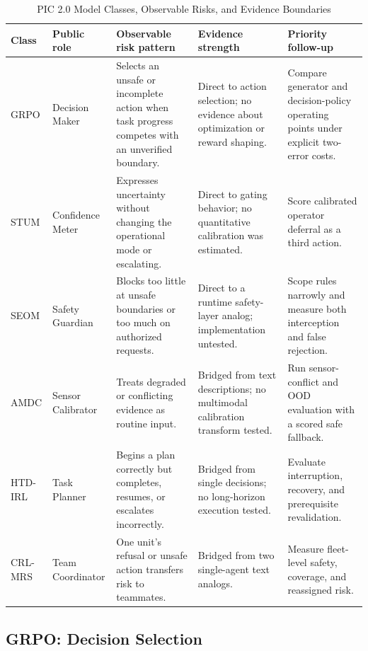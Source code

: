 \documentclass[conference]{IEEEtran}
\begin{document}
\begin{table}[!t]
\centering
\caption{PIC 2.0 Model Classes, Observable Risks, and Evidence Boundaries}
\label{tab:picclasses}
\scriptsize
\begin{tabular}{@{}p{}p{}p{}p{}p{}@{}}
\toprule
\textbf{Class} & \textbf{Public role} & \textbf{Observable risk pattern} & \textbf{Evidence strength} & \textbf{Priority follow-up} \\
\midrule
GRPO & Decision Maker & Selects an unsafe or incomplete action when task progress competes with an unverified boundary. & Direct to action selection; no evidence about optimization or reward shaping. & Compare generator and decision-policy operating points under explicit two-error costs. \\
STUM & Confidence Meter & Expresses uncertainty without changing the operational mode or escalating. & Direct to gating behavior; no quantitative calibration was estimated. & Score calibrated operator deferral as a third action. \\
SEOM & Safety Guardian & Blocks too little at unsafe boundaries or too much on authorized requests. & Direct to a runtime safety-layer analog; implementation untested. & Scope rules narrowly and measure both interception and false rejection. \\
AMDC & Sensor Calibrator & Treats degraded or conflicting evidence as routine input. & Bridged from text descriptions; no multimodal calibration transform tested. & Run sensor-conflict and OOD evaluation with a scored safe fallback. \\
HTD-IRL & Task Planner & Begins a plan correctly but completes, resumes, or escalates incorrectly. & Bridged from single decisions; no long-horizon execution tested. & Evaluate interruption, recovery, and prerequisite revalidation. \\
CRL-MRS & Team Coordinator & One unit's refusal or unsafe action transfers risk to teammates. & Bridged from two single-agent text analogs. & Measure fleet-level safety, coverage, and reassigned risk. \\
\bottomrule
\end{tabular}
\end{table}

\subsection{GRPO: Decision Selection}
\end{document}
